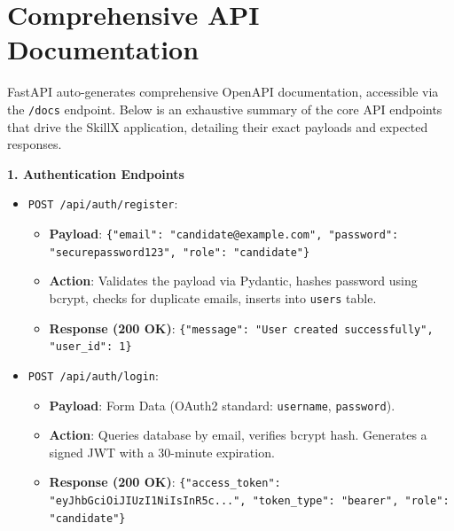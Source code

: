 \documentclass[12pt,a4paper]{report}
\begin{document}
\section{Comprehensive API Documentation}

FastAPI auto-generates comprehensive OpenAPI documentation, accessible via the \texttt{/docs} endpoint. Below is an exhaustive summary of the core API endpoints that drive the SkillX application, detailing their exact payloads and expected responses.

\textbf{1. Authentication Endpoints}
\begin{itemize}
    \item \texttt{POST /api/auth/register}: 
      \begin{itemize}
          \item \textbf{Payload}: \texttt{\{"email": "candidate@example.com", "password": "securepassword123", "role": "candidate"\}}
          \item \textbf{Action}: Validates the payload via Pydantic, hashes password using bcrypt, checks for duplicate emails, inserts into \texttt{users} table.
          \item \textbf{Response (200 OK)}: \texttt{\{"message": "User created successfully", "user\_id": 1\}}
      \end{itemize}
    \item \texttt{POST /api/auth/login}: 
      \begin{itemize}
          \item \textbf{Payload}: Form Data (OAuth2 standard: \texttt{username}, \texttt{password}).
          \item \textbf{Action}: Queries database by email, verifies bcrypt hash. Generates a signed JWT with a 30-minute expiration.
          \item \textbf{Response (200 OK)}: \texttt{\{"access\_token": "eyJhbGciOiJIUzI1NiIsInR5c...", "token\_type": "bearer", "role": "candidate"\}}
      \end{itemize}
\end{itemize}
\end{document}

